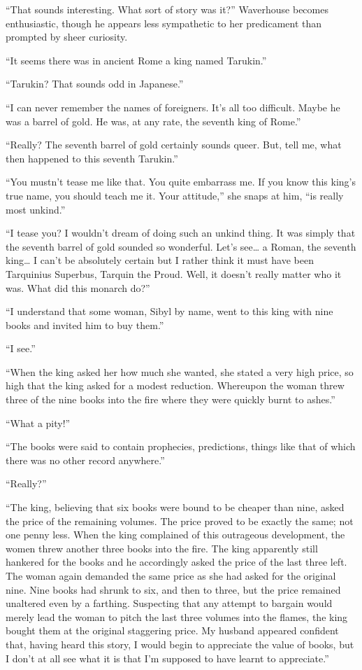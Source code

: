 \documentclass{book}
\begin{document}
``That sounds interesting. What sort of story was it?'' Waverhouse
becomes enthusiastic, though he appears less sympathetic to her
predicament than prompted by sheer curiosity.

``It seems there was in ancient Rome a king named Tarukin.''

``Tarukin? That sounds odd in Japanese.''

``I can never remember the names of foreigners. It's all too difficult.
Maybe he was a barrel of gold. He was, at any rate, the seventh king of
Rome.''

``Really? The seventh barrel of gold certainly sounds queer. But, tell
me, what then happened to this seventh Tarukin.''

``You mustn't tease me like that. You quite embarrass me. If you know
this king's true name, you should teach me it. Your attitude,'' she
snaps at him, ``is really most unkind.''

``I tease you? I wouldn't dream of doing such an unkind thing. It was
simply that the seventh barrel of gold sounded so wonderful. Let's
see\ldots{} a Roman, the seventh king\ldots{} I can't be absolutely
certain but I rather think it must have been Tarquinius Superbus,
Tarquin the Proud. Well, it doesn't really matter who it was. What did
this monarch do?''

``I understand that some woman, Sibyl by name, went to this king with
nine books and invited him to buy them.''

``I see.''

``When the king asked her how much she wanted, she stated a very high
price, so high that the king asked for a modest reduction. Whereupon the
woman threw three of the nine books into the fire where they were
quickly burnt to ashes.''

``What a pity!''

``The books were said to contain prophecies, predictions, things like
that of which there was no other record anywhere.''

``Really?''

``The king, believing that six books were bound to be cheaper than nine,
asked the price of the remaining volumes. The price proved to be exactly
the same; not one penny less. When the king complained of this
outrageous development, the women threw another three books into the
fire. The king apparently still hankered for the books and he
accordingly asked the price of the last three left. The woman again
demanded the same price as she had asked for the original nine. Nine
books had shrunk to six, and then to three, but the price remained
unaltered even by a farthing. Suspecting that any attempt to bargain
would merely lead the woman to pitch the last three volumes into the
flames, the king bought them at the original staggering price. My
husband appeared confident that, having heard this story, I would begin
to appreciate the value of books, but I don't at all see what it is that
I'm supposed to have learnt to appreciate.''
\end{document}
